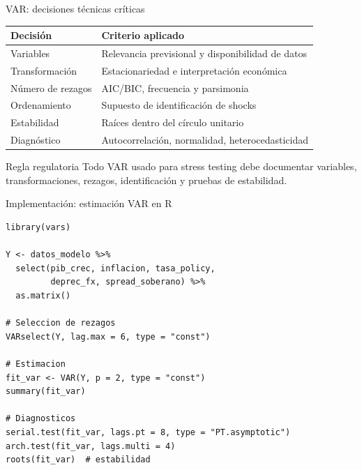 \documentclass[10pt,aspectratio=169]{beamer}
\begin{document}
\begin{frame}{VAR: decisiones técnicas críticas}
\begin{table}
\small
\begin{tabular}{p{3.2cm}p{7.6cm}}
\toprule
Decisión & Criterio aplicado \\
\midrule
Variables & Relevancia previsional y disponibilidad de datos \\
Transformación & Estacionariedad e interpretación económica \\
Número de rezagos & AIC/BIC, frecuencia y parsimonia \\
Ordenamiento & Supuesto de identificación de shocks \\
Estabilidad & Raíces dentro del círculo unitario \\
Diagnóstico & Autocorrelación, normalidad, heterocedasticidad \\
\bottomrule
\end{tabular}
\end{table}

\begin{block}{Regla regulatoria}
Todo VAR usado para stress testing debe documentar variables, transformaciones, rezagos, identificación y pruebas de estabilidad.
\end{block}
\end{frame}

\begin{frame}[fragile]{Implementación: estimación VAR en R}
\begin{lstlisting}
library(vars)

Y <- datos_modelo %>%
  select(pib_crec, inflacion, tasa_policy,
         deprec_fx, spread_soberano) %>%
  as.matrix()

# Seleccion de rezagos
VARselect(Y, lag.max = 6, type = "const")

# Estimacion
fit_var <- VAR(Y, p = 2, type = "const")
summary(fit_var)

# Diagnosticos
serial.test(fit_var, lags.pt = 8, type = "PT.asymptotic")
arch.test(fit_var, lags.multi = 4)
roots(fit_var)  # estabilidad
\end{lstlisting}
\end{frame}
\end{document}
